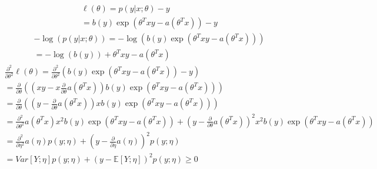 \begin{answer}
\begin{eqnarray*}
\ell(\theta)=p(y|x;\theta)-y\\
=b(y)\exp(\theta^Txy-a(\theta^Tx))-y
\end{eqnarray*}
\begin{eqnarray*}
-\log\left(p(y|x;\theta)\right)=-\log\left(b(y)\exp(\theta^Txy-a(\theta^Tx))\right)\\
=-\log(b(y))+\theta^Txy-a(\theta^Tx)
\end{eqnarray*}
\begin{eqnarray*}
\frac{\partial^2}{\partial\theta^2}\ell(\theta)=\frac{\partial^2}{\partial\theta^2}\left(b(y)\exp(\theta^Txy-a(\theta^Tx))-y\right)\\
=\frac{\partial}{\partial\theta}\left(\left(xy-x\frac{\partial}{\partial\theta}a(\theta^Tx)\right)b(y)\exp(\theta^Txy-a(\theta^Tx))\right)\\
=\frac{\partial}{\partial\theta}\left(\left(y-\frac{\partial}{\partial\theta}a(\theta^Tx)\right)xb(y)\exp(\theta^Txy-a(\theta^Tx))\right)\\
=\frac{\partial^2}{\partial\theta^2}a(\theta^Tx)x^2b(y)\exp(\theta^Txy-a(\theta^Tx))+\left(y-\frac{\partial}{\partial\theta}a(\theta^Tx)\right)^2x^2b(y)\exp(\theta^Txy-a(\theta^Tx))\\
=\frac{\partial^2}{\partial\eta^2}a(\eta)p(y;\eta)+\left(y-\frac{\partial}{\partial\eta}a(\eta)\right)^2p(y;\eta)\\
=Var[Y; \eta]p(y;\eta)+\left(y-\mathbb{E}[Y; \eta]\right)^2p(y;\eta)\geq0
\end{eqnarray*}
\end{answer}
